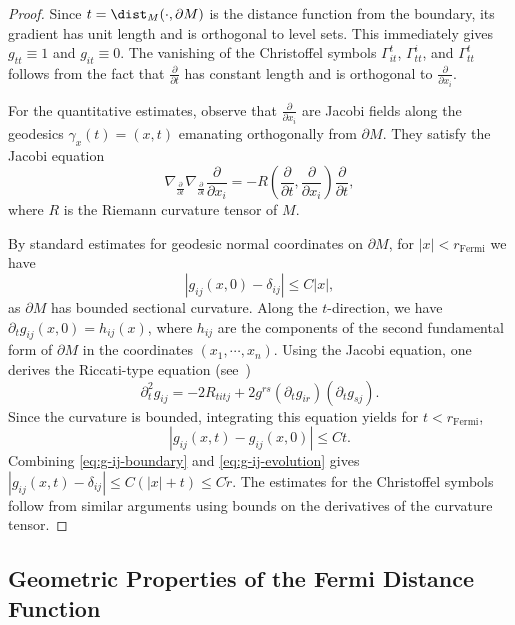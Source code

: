 \begin{proof}
Since $t=\dist_M(\cdot,\partial M)$ is the distance function from the boundary, its gradient has
unit length and is orthogonal to level sets. This immediately gives $g_{tt}\equiv 1$ and
$g_{it}\equiv 0$. The vanishing of the Christoffel symbols $\Gamma_{it}^t$, $\Gamma_{tt}^i$, and
$\Gamma_{tt}^t$ follows from the fact that $\frac{\partial}{\partial t}$ has constant length and
is orthogonal to $\frac{\partial}{\partial x_i}$.

For the quantitative estimates, observe that $\frac{\partial}{\partial x_i}$ are Jacobi fields
along the geodesics $\gamma_x(t)=(x,t)$ emanating orthogonally from $\partial M$. They satisfy
the Jacobi equation
\[
\nabla_{\frac{\partial}{\partial t}} \nabla_{\frac{\partial}{\partial t}} \frac{\partial}{\partial x_i}
= -R\left(\frac{\partial}{\partial t},\frac{\partial}{\partial x_i}\right) \frac{\partial}{\partial t},
\]
where $R$ is the Riemann curvature tensor of $M$.

By standard estimates for geodesic normal coordinates on $\partial M$, for $|x|<r_{\mathrm{Fermi}}$
we have
\begin{equation}\label{eq:g-ij-boundary}
|g_{ij}(x,0)-\delta_{ij}| \leq C |x|,
\end{equation}
as $\partial M$ has bounded sectional curvature. Along the $t$-direction, we have
$\partial_t g_{ij}(x,0)=h_{ij}(x)$, where $h_{ij}$ are the components of the second fundamental
form of $\partial M$ in the coordinates $(x_1,\cdots,x_n)$. Using the Jacobi equation, one derives
the Riccati-type equation (see~\cite[Lemma~2.2]{Marques05})
\[
\partial_t^2 g_{ij}=-2 R_{titj} +2g^{rs} (\partial_t g_{ir}) (\partial_t g_{sj}).
\]
Since the curvature is bounded, integrating this equation yields for $t < r_{\mathrm{Fermi}}$,
\begin{equation}\label{eq:g-ij-evolution}
|g_{ij}(x,t) - g_{ij}(x,0)| \leq C t.
\end{equation}
Combining \eqref{eq:g-ij-boundary} and \eqref{eq:g-ij-evolution} gives
$|g_{ij}(x,t)-\delta_{ij}|\leq C(|x|+t)\leq C\tilde r$. The estimates for the Christoffel symbols
follow from similar arguments using bounds on the derivatives of the curvature tensor.
\end{proof}

\subsection{Geometric Properties of the Fermi Distance Function}

